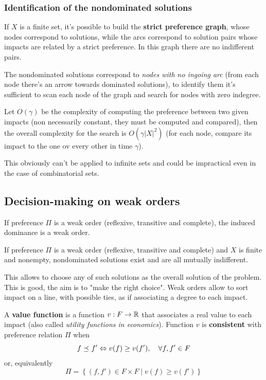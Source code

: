 \subsubsection{Identification of the nondominated solutions}

If $X$ is a finite set, it's possible to build the \textbf{strict preference graph}, whose nodes correspond to solutions, while the arcs correspond to solution pairs whose impacts are related by a strict preference. In this graph there are no indifferent pairs. 

The nondominated solutions correspond to \textit{nodes with no ingoing arc} (from each node there's an arrow towards dominated solutions), to identify them it's sufficient to scan each node of the graph and search for nodes with zero indegree.

Let $O(\gamma)$ be the complexity of computing the preference between two given impacts (non necessarily constant, they must be computed and compared), then the overall complexity for the search is $O\left(\gamma |X|^2\right)$ (for each node, compare its impact to the one ov every other in time $\gamma$).

This obviously can't be applied to infinite sets and could be impractical even in the case of combinatorial sets.

\subsection{Decision-making on weak orders}
\label{subsec:decisionmakingweakorders}

\begin{theo}
	If preference $\Pi$ is a weak order (reflexive, transitive and complete), the induced dominance is a weak order. \\
\end{theo}

\begin{theo}
	If preference $\Pi$ is a weak order (reflexive, transitive and complete) and $X$ is finite and nonempty, nondominated solutions exist and are all mutually indifferent.
\end{theo}

This allows to choose any of such solutions as the overall solution of the problem. This is good, the aim is to "make the right choice". Weak orders allow to sort impact on a line, with possible ties, as if associating a degree to each impact. \\

\begin{definition}
	A \textbf{value function} is a function $v: F \rightarrow \operatorname{\mathbb{R}}$ that associates a real value to each impact (also called \textit{utility functions in economics}). Function $v$ is \textbf{consistent} with preference relation $\Pi$ when 
	$$ f \preceq_{} f' \Leftrightarrow v(f) \geq v(f'), \quad \forall f,f' \in F$$
	or, equivalently
	$$ \Pi = \left\{(f, f') \in F \times F \mid v(f) \geq v(f') \right\} $$
\end{definition}

